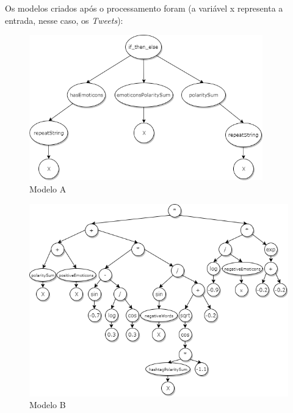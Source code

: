 \documentclass[12pt]{article}
\begin{document}
Os modelos criados após o processamento foram (a variável x representa a entrada, nesse caso, os \emph{Tweets}):

	\begin{figure}[H]
		\centering
		\includegraphics[width=0.9\textwidth]{treeA}
		\caption{Modelo A}
		\label{AModel}
	\end{figure}
	
	\begin{figure}[H]
		\centering
		\includegraphics[width=1.0\textwidth]{treeB2}
		\caption{Modelo B}
		\label{BModel}
	\end{figure}
\end{document}
